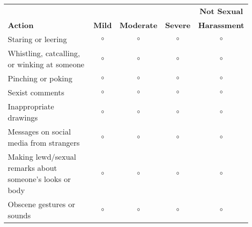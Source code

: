\begin{adjustwidth*}{-10em}{}

\begin{table}[H]
    \centering
    \begin{tabular}{m{5.5cm} m{1.5cm} m{1.5cm} m{1.5cm} m{2cm}}
        \toprule
        \rowcolor{White}\textbf{} & {\textbf{}} & {\textbf{}} & {\textbf{}} & \multicolumn{1}{c}{\textbf{Not Sexual}} \\
        \rowcolor{White}\textbf{Action} & \multicolumn{1}{c}{\textbf{Mild}} & \multicolumn{1}{c}{\textbf{Moderate}} & \multicolumn{1}{c}{\textbf{Severe}} & \multicolumn{1}{c}{\textbf{Harassment}} \\
        \midrule
        Staring or leering & \multicolumn{1}{c}{{\Large $\circ$}} & \multicolumn{1}{c}{{\Large $\circ$}} & \multicolumn{1}{c}{{\Large $\circ$}} & \multicolumn{1}{c}{{\Large $\circ$}}\\
        Whistling, catcalling, or winking at someone & \multicolumn{1}{c}{{\Large $\circ$}} & \multicolumn{1}{c}{{\Large $\circ$}} & \multicolumn{1}{c}{{\Large $\circ$}} & \multicolumn{1}{c}{{\Large $\circ$}}\\
        Pinching or poking & \multicolumn{1}{c}{{\Large $\circ$}} & \multicolumn{1}{c}{{\Large $\circ$}} & \multicolumn{1}{c}{{\Large $\circ$}} & \multicolumn{1}{c}{{\Large $\circ$}}\\
        Sexist comments & \multicolumn{1}{c}{{\Large $\circ$}} & \multicolumn{1}{c}{{\Large $\circ$}} & \multicolumn{1}{c}{{\Large $\circ$}} & \multicolumn{1}{c}{{\Large $\circ$}}\\
        Inappropriate drawings & \multicolumn{1}{c}{{\Large $\circ$}} & \multicolumn{1}{c}{{\Large $\circ$}} & \multicolumn{1}{c}{{\Large $\circ$}} & \multicolumn{1}{c}{{\Large $\circ$}}\\
        Messages on social media from strangers & \multicolumn{1}{c}{{\Large $\circ$}} & \multicolumn{1}{c}{{\Large $\circ$}} & \multicolumn{1}{c}{{\Large $\circ$}} & \multicolumn{1}{c}{{\Large $\circ$}}\\
        Making lewd/sexual remarks about someone's looks or body & \multicolumn{1}{c}{{\Large $\circ$}} & \multicolumn{1}{c}{{\Large $\circ$}} & \multicolumn{1}{c}{{\Large $\circ$}} & \multicolumn{1}{c}{{\Large $\circ$}}\\
        Obscene gestures or sounds & \multicolumn{1}{c}{{\Large $\circ$}} & \multicolumn{1}{c}{{\Large $\circ$}} & \multicolumn{1}{c}{{\Large $\circ$}} & \multicolumn{1}{c}{{\Large $\circ$}}\\

\end{tabular}
\end{table}
\end{adjustwidth*}
